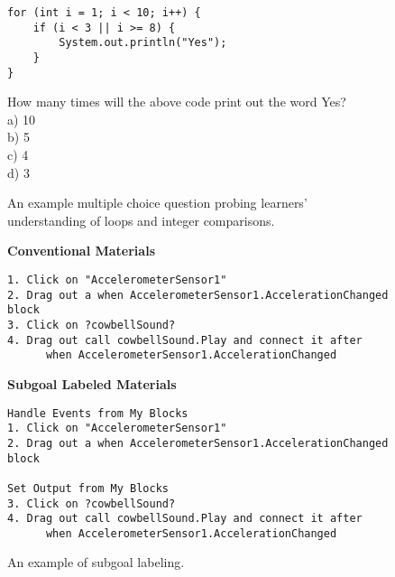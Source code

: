 \documentclass[10pt,letterpaper]{article}
\begin{document}
\pagebreak

\begin{figure}[h]
\begin{mdframed}
\begin{verbatim}
for (int i = 1; i < 10; i++) {
    if (i < 3 || i >= 8) {
        System.out.println("Yes");
    }
}
\end{verbatim}
How many times will the above code print out the word Yes?\\
a) 10\\
b) 5\\
c) 4\\
d) 3
\end{mdframed}
\caption{An example multiple choice question probing learners' understanding of loops and integer comparisons.}
\label{fig:mcq}
\end{figure}

\begin{figure}[h]
\begin{mdframed}
\noindent
\textbf{Conventional Materials}
\begin{verbatim}
1. Click on "AccelerometerSensor1"
2. Drag out a when AccelerometerSensor1.AccelerationChanged block
3. Click on ?cowbellSound? 
4. Drag out call cowbellSound.Play and connect it after
      when AccelerometerSensor1.AccelerationChanged
\end{verbatim}

\noindent
\textbf{Subgoal Labeled Materials}
\begin{verbatim}
Handle Events from My Blocks
1. Click on "AccelerometerSensor1"
2. Drag out a when AccelerometerSensor1.AccelerationChanged block

Set Output from My Blocks
3. Click on ?cowbellSound? 
4. Drag out call cowbellSound.Play and connect it after
      when AccelerometerSensor1.AccelerationChanged
\end{verbatim}
\end{mdframed}
\caption{An example of subgoal labeling.}
\label{fig:subgoal}
\end{figure}


%
%

\pagebreak


\end{document}

